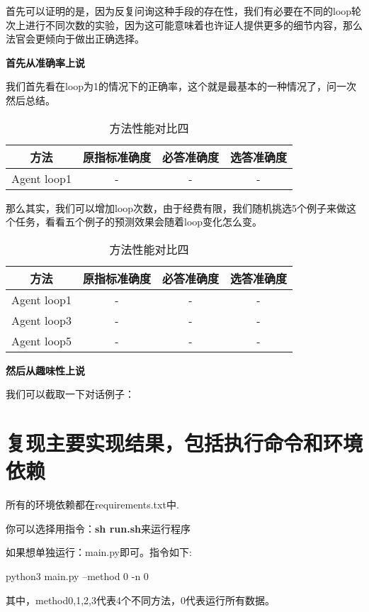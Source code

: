\documentclass[answers]{exam}  %
\begin{document}
首先可以证明的是，因为反复问询这种手段的存在性，我们有必要在不同的loop轮次上进行不同次数的实验，因为这可能意味着也许证人提供更多的细节内容，那么法官会更倾向于做出正确选择。

\textbf{首先从准确率上说}

我们首先看在loop为1的情况下的正确率，这个就是最基本的一种情况了，问一次然后总结。

\begin{table}[h]
    \centering
    \begin{tabular}{cccc}
    \toprule
    \textbf{方法} & \textbf{原指标准确度} & \textbf{必答准确度} &\textbf{选答准确度}\\
    \midrule
    Agent loop1 & - & - & - \\
    \bottomrule
    \end{tabular}
    \caption{方法性能对比四}
\end{table}

那么其实，我们可以增加loop次数，由于经费有限，我们随机挑选5个例子来做这个任务，看看五个例子的预测效果会随着loop变化怎么变。

\begin{table}[h]
    \centering
    \begin{tabular}{cccc}
    \toprule
    \textbf{方法} & \textbf{原指标准确度} & \textbf{必答准确度} &\textbf{选答准确度}\\
    \midrule
    Agent loop1 & - & - & - \\
    \hline
    Agent loop3 & - & - & - \\
    \hline
    Agent loop5 & - & - & - \\
    \bottomrule
    \end{tabular}
    \caption{方法性能对比四}
\end{table}

\textbf{然后从趣味性上说}

我们可以截取一下对话例子：

\section{复现主要实现结果，包括执行命令和环境依赖}

所有的环境依赖都在requirements.txt中.

你可以选择用指令：\textbf{sh run.sh}来运行程序

如果想单独运行：main.py即可。指令如下:

python3 main.py --method 0 -n 0

其中，method0,1,2,3代表4个不同方法，0代表运行所有数据。
\end{document}
